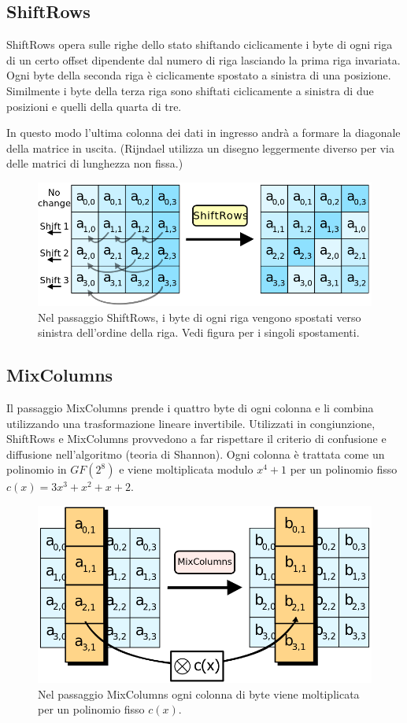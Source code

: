 \subsection{ShiftRows}
ShiftRows opera sulle righe dello stato shiftando ciclicamente i byte di ogni riga di un certo offset dipendente dal numero di riga lasciando la prima riga invariata.
Ogni byte della seconda riga è ciclicamente spostato a sinistra di una posizione. Similmente i byte della terza riga sono shiftati ciclicamente a sinistra di due posizioni e quelli della quarta di tre. 

In questo modo l'ultima colonna dei dati in ingresso andrà a formare la diagonale della matrice in uscita. (Rijndael utilizza un disegno leggermente diverso per via delle matrici di lunghezza non fissa.)


\begin{figure}[H]
\centering
\includegraphics[scale=0.3]{img/shiftRows}
\caption{Nel passaggio ShiftRows, i byte di ogni riga vengono spostati verso sinistra dell'ordine della riga. Vedi figura per i singoli spostamenti.}
\end{figure}

\subsection{MixColumns}
Il passaggio MixColumns prende i quattro byte di ogni colonna e li combina utilizzando una trasformazione lineare invertibile. Utilizzati in congiunzione, ShiftRows e MixColumns provvedono a far rispettare il criterio di confusione e diffusione nell'algoritmo (teoria di Shannon). Ogni colonna è trattata come un polinomio in \(GF(2^8)\) e viene moltiplicata modulo \(x^4+1\) per un polinomio fisso \(c(x)=3x^3+x^2+x+2\).

\begin{figure}[H]
\centering
\includegraphics[scale=0.3]{img/mixColumns}
\caption{Nel passaggio MixColumns ogni colonna di byte viene moltiplicata per un polinomio fisso \(c(x)\).}
\end{figure}
